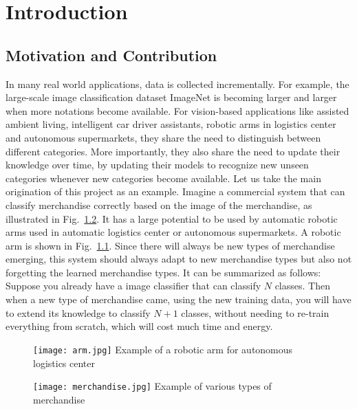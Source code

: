 
\chapter{Introduction}
\label{chap:intro}
\section{Motivation and Contribution}
In many real world applications, data is collected incrementally. For example, the large-scale image classification dataset ImageNet is becoming larger and larger when more notations become available. For vision-based applications like assisted ambient living, intelligent car driver assistants, robotic arms in logistics center and autonomous supermarkets, they share the need to distinguish between different categories. More importantly, they also share the need to update their knowledge over time, by updating their models to recognize new unseen categories whenever new categories become available. Let us take the main origination of this project as an example. Imagine a commercial system that can classify merchandise correctly based on the image of the merchandise, as illustrated in Fig.~\ref{fig:merchandise}. It has a large potential to be used by automatic robotic arms used in automatic logistics center or autonomous supermarkets. A robotic arm is shown in Fig.~\ref{fig:arm}. Since there will always be new types of merchandise emerging, this system should always adapt to new merchandise types but also not forgetting the learned merchandise types. It can be summarized as follows: Suppose you already have a image classifier that can classify $N$ classes. Then when a new type of merchandise came, using the new training data, you will have to extend its knowledge to classify $N+1$ classes, without needing to re-train everything from scratch, which will cost much time and energy.

\begin{figure}[!htp]
	\centering
	\texttt{[image: arm.jpg]}
	{Example of a robotic arm for autonomous logistics center}
	\label{fig:arm}
\end{figure}
\begin{figure}[!htp]
	\centering
	\texttt{[image: merchandise.jpg]}
	{Example of various types of merchandise}
	\label{fig:merchandise}
\end{figure}

